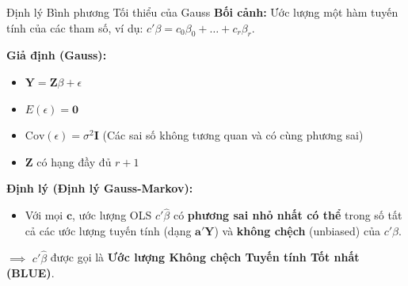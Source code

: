 \begin{frame}{Định lý Bình phương Tối thiểu của Gauss }
    \textbf{Bối cảnh:}
    Ước lượng một hàm tuyến tính của các tham số, ví dụ: $c'\beta = c_0\beta_0 + \dots + c_r\beta_r$.

    \bigskip
    \textbf{Giả định (Gauss):}
    \begin{itemize}
        \item $\mathbf{Y} = \mathbf{Z}\beta + \epsilon$
        \item $E(\epsilon) = \mathbf{0}$
        \item $\text{Cov}(\epsilon) = \sigma^2\mathbf{I}$ (Các sai số không tương quan và có cùng phương sai)
        \item $\mathbf{Z}$ có hạng đầy đủ $r+1$
    \end{itemize}
    
    \bigskip
    \textbf{Định lý (Định lý Gauss-Markov):}
    \begin{itemize}
        \item Với mọi $\mathbf{c}$, ước lượng OLS $c'\hat{\beta}$ có \textbf{phương sai nhỏ nhất có thể} trong số tất cả các ước lượng tuyến tính (dạng $\mathbf{a}'\mathbf{Y}$) và \textbf{không chệch} (unbiased) của $c'\beta$.
    \end{itemize}
    \bigskip
    $\implies$ $c'\hat{\beta}$ được gọi là \textbf{Ước lượng Không chệch Tuyến tính Tốt nhất (BLUE)}.
\end{frame}

